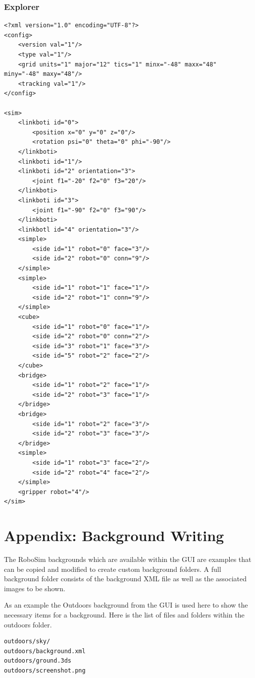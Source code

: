 \documentclass{article}
\begin{document}
\subsubsection{Explorer}
\begin{verbatim}
<?xml version="1.0" encoding="UTF-8"?>
<config>
    <version val="1"/>
    <type val="1"/>
	<grid units="1" major="12" tics="1" minx="-48" maxx="48" miny="-48" maxy="48"/>
    <tracking val="1"/>
</config>

<sim>
    <linkboti id="0">
        <position x="0" y="0" z="0"/>
        <rotation psi="0" theta="0" phi="-90"/>
    </linkboti>
    <linkboti id="1"/>
    <linkboti id="2" orientation="3">
        <joint f1="-20" f2="0" f3="20"/>
    </linkboti>
    <linkboti id="3">
        <joint f1="-90" f2="0" f3="90"/>
    </linkboti>
    <linkbotl id="4" orientation="3"/>
    <simple>
        <side id="1" robot="0" face="3"/>
        <side id="2" robot="0" conn="9"/>
    </simple>
    <simple>
        <side id="1" robot="1" face="1"/>
        <side id="2" robot="1" conn="9"/>
    </simple>
    <cube>
        <side id="1" robot="0" face="1"/>
        <side id="2" robot="0" conn="2"/>
        <side id="3" robot="1" face="3"/>
        <side id="5" robot="2" face="2"/>
    </cube>
    <bridge>
        <side id="1" robot="2" face="1"/>
        <side id="2" robot="3" face="1"/>
    </bridge>
    <bridge>
        <side id="1" robot="2" face="3"/>
        <side id="2" robot="3" face="3"/>
    </bridge>
    <simple>
        <side id="1" robot="3" face="2"/>
        <side id="2" robot="4" face="2"/>
    </simple>
    <gripper robot="4"/>
</sim>
\end{verbatim}

\newpage
\section{Appendix: Background Writing}
\label{app:backgrounds}
The RoboSim backgrounds which are available within the GUI are examples that can
be copied and modified to create custom background folders.  A full background
folder consists of the background XML file as well as the associated images to
be shown.

As an example the Outdoors background from the GUI is used here to show the
necessary items for a background.  Here is the list of files and folders within
the outdoors folder.
\begin{verbatim}
outdoors/sky/
outdoors/background.xml
outdoors/ground.3ds
outdoors/screenshot.png
\end{verbatim}
\end{document}

